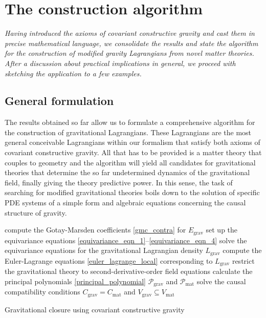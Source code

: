 \chapter{The construction algorithm}

\textit{Having introduced the axioms of covariant constructive gravity and cast them in precise mathematical language, we consolidate the results and state the algorithm for the construction of modified gravity Lagrangians from novel matter theories. After a discussion about practical implications in general, we proceed with sketching the application to a few examples.}

\section{General formulation}

The results obtained so far allow us to formulate a comprehensive algorithm for the construction of gravitational Lagrangians. These Lagrangians are the most general conceivable Lagrangians within our formalism that satisfy both axioms of covariant constructive gravity. All that has to be provided is a matter theory that couples to geometry and the algorithm will yield all candidates for gravitational theories that determine the so far undetermined dynamics of the gravitational field, finally giving the theory predictive power. In this sense, the task of searching for modified gravitational theories boils down to the solution of specific PDE systems of a simple form and algebraic equations concerning the causal structure of gravity.

\begin{algorithm}[H]\label{algorithm}
  \DontPrintSemicolon
  compute the Gotay-Marsden coefficients \eqref{gmc_contra} for $E_\text{grav}$ \;
  set up the equivariance equations \eqref{equivariance_eqn_1}--\eqref{equivariance_eqn_4} \;
  solve the equivariance equations for the gravitational Lagrangian density $L_\text{grav}$ \;
  compute the Euler-Lagrange equations \eqref{euler_lagrange_local} corresponding to $L_\text{grav}$ \;
  restrict the gravitational theory to second-derivative-order field equations \;
  calculate the principal polynomials \eqref{principal_polynomial} $\mathcal P_\text{grav}$ and $\mathcal P_\text{mat}$ \;
  solve the causal compatibility conditions $C_\text{grav} = C_\text{mat}$ and $V_\text{grav} \subseteq V_\text{mat}$
  \caption{Gravitational closure using covariant constructive gravity}
\end{algorithm}

